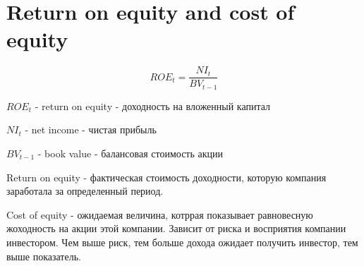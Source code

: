 \documentclass{article}
\begin{document}
\section{Return on equity and cost of equity}
$$ROE_{t} =\frac{NI_{t}}{BV_{t-1}}$$

$ROE_{t}$ - return on equity - доходность на вложенный капитал

$NI_{t}$ - net income - чистая прибыль

$BV_{t-1}$ - book value - балансовая стоимость акции

Return on equity - фактическая стоимость доходности, которую компания заработала за определенный период. 

Cost of equity - ожидаемая величина, котррая показывает равновесную жоходность на акции этой компании. Зависит от риска и восприятия компании инвестором. Чем выше риск, тем больше дохода ожидает получить инвестор, тем выше показатель.
\end{document}
